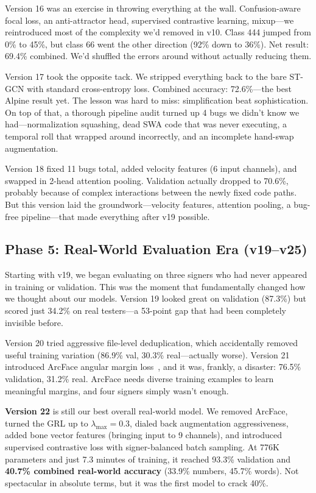 \documentclass[conference]{IEEEtran}
\begin{document}
Version 16 was an exercise in throwing everything at the wall. Confusion-aware focal loss, an anti-attractor head, supervised contrastive learning, mixup---we reintroduced most of the complexity we'd removed in v10. Class 444 jumped from 0\% to 45\%, but class 66 went the other direction (92\% down to 36\%). Net result: 69.4\% combined. We'd shuffled the errors around without actually reducing them.

Version 17 took the opposite tack. We stripped everything back to the bare ST-GCN with standard cross-entropy loss. Combined accuracy: 72.6\%---the best Alpine result yet. The lesson was hard to miss: simplification beat sophistication. On top of that, a thorough pipeline audit turned up 4 bugs we didn't know we had---normalization squashing, dead SWA code that was never executing, a temporal roll that wrapped around incorrectly, and an incomplete hand-swap augmentation.

Version 18 fixed 11 bugs total, added velocity features (6 input channels), and swapped in 2-head attention pooling. Validation actually dropped to 70.6\%, probably because of complex interactions between the newly fixed code paths. But this version laid the groundwork---velocity features, attention pooling, a bug-free pipeline---that made everything after v19 possible.

\subsection{Phase 5: Real-World Evaluation Era (v19--v25)}

Starting with v19, we began evaluating on three signers who had never appeared in training or validation. This was the moment that fundamentally changed how we thought about our models. Version 19 looked great on validation (87.3\%) but scored just 34.2\% on real testers---a 53-point gap that had been completely invisible before.

Version 20 tried aggressive file-level deduplication, which accidentally removed useful training variation (86.9\% val, 30.3\% real---actually worse). Version 21 introduced ArcFace angular margin loss~\cite{deng2019arcface}, and it was, frankly, a disaster: 76.5\% validation, 31.2\% real. ArcFace needs diverse training examples to learn meaningful margins, and four signers simply wasn't enough.

\textbf{Version 22} is still our best overall real-world model. We removed ArcFace, turned the GRL up to $\lambda_{\max}=0.3$, dialed back augmentation aggressiveness, added bone vector features (bringing input to 9 channels), and introduced supervised contrastive loss with signer-balanced batch sampling. At 776K parameters and just 7.3 minutes of training, it reached 93.3\% validation and \textbf{40.7\% combined real-world accuracy} (33.9\% numbers, 45.7\% words). Not spectacular in absolute terms, but it was the first model to crack 40\%.
\end{document}
